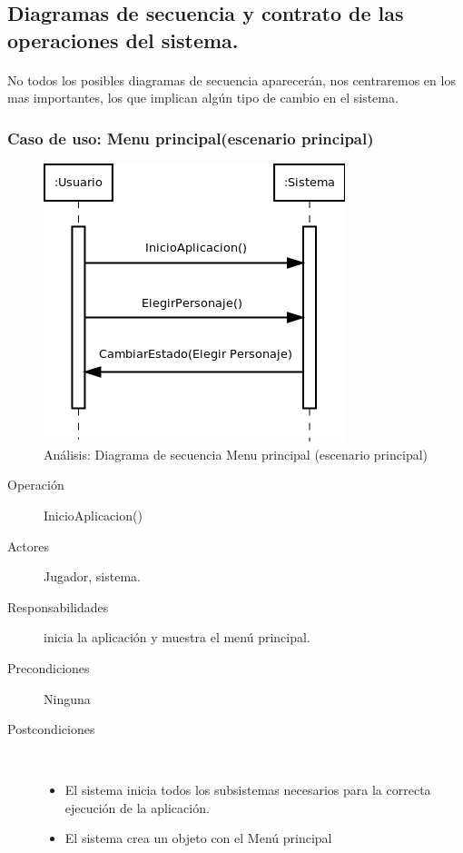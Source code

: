 \subsection{Diagramas de secuencia y contrato de las operaciones del sistema.}

\paragraph{}
No todos los posibles diagramas de secuencia aparecerán, nos centraremos en los mas importantes, los que implican algún tipo de 
cambio en el sistema.

\subsubsection{Caso de uso: Menu principal(escenario principal)}

\begin{figure}[H]
  \label{secuencia_menu_principal1}
  \begin{center}
    \includegraphics[scale=0.6]{imagenes/analisis/secuencia_menu_principal1.png}
  \end{center}
  \caption{Análisis: Diagrama de secuencia Menu principal (escenario principal)}
\end{figure}

\begin{description}
    \item [Operación] InicioAplicacion()
    \item [Actores] Jugador, sistema.
    \item [Responsabilidades] inicia la aplicación y muestra el menú principal.
    \item [Precondiciones] Ninguna
    \item [Postcondiciones] $\quad$
        \begin{itemize}
            \item El sistema inicia todos los subsistemas necesarios para la correcta ejecución de la aplicación.
            \item El sistema crea un objeto con el Menú principal
        \end{itemize}
\end{description}

